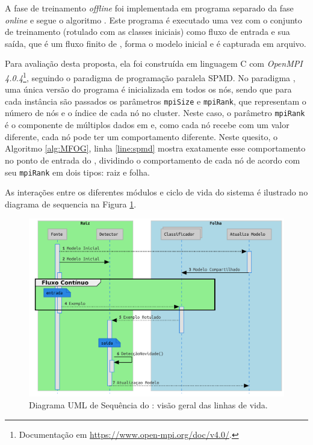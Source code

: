 A fase de treinamento \emph{offline} foi implementada em programa separado da
fase \emph{online} e segue o algoritmo \minas \cite{Faria2016minas}.
Este programa é executado uma vez com o conjunto de treinamento (rotulado com as
classes iniciais) como fluxo de entrada e sua saída, que é um fluxo finito de
\mclusters, forma o modelo inicial e é capturada em arquivo.


Para avaliação desta proposta, ela foi construída em linguagem C com
\emph{OpenMPI 4.0.4}\footnote{Documentação em
\url{https://www.open-mpi.org/doc/v4.0/}.}, seguindo o paradigma de programação
paralela \acf{SPMD}.
No paradigma \spmd, uma única versão do programa é inicializada em todos os nós, sendo que
para cada instância são passados os parâmetros \texttt{mpiSize} e
\texttt{mpiRank}, que representam o número de nós e o índice de cada nó no
cluster.
Neste caso, o parâmetro \texttt{mpiRank} é o componente de múltiplos dados em
\spmd e, como cada nó recebe com um valor diferente, cada nó pode ter um
comportamento diferente.
Neste quesito, o Algoritmo \ref{alg:MFOG}, linha \ref{line:spmd} mostra
exatamente esse comportamento no ponto de entrada do \mfog, dividindo o
comportamento de cada nó de acordo com seu \texttt{mpiRank} em dois tipos: raiz
e folha.

As interações entre os diferentes módulos e ciclo de vida do sistema é ilustrado
no diagrama de sequencia na Figura \ref{fig:mfog-mpi-life}.

\begin{figure}[htb]
  \centerline{
    \includegraphics[width=0.80\linewidth,page=1]{figures/lifecycle-uml-svg.pdf}
  }
  \caption{Diagrama UML de Sequência do \mfog: visão geral das linhas de vida.}
  \label{fig:mfog-mpi-life}
\end{figure}


